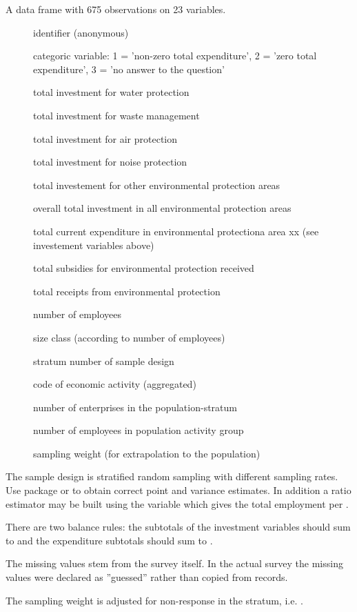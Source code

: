 \begin{Format}
A data frame with 675 observations on 23 variables.
\begin{description}

\item[] identifier (anonymous)
\item[] categoric variable: 1 = 'non-zero total expenditure', 2  = 'zero total expenditure', 3 = 'no answer to the question'
\item[] total investment for water protection
\item[] total investment for waste management
\item[] total investment for air protection
\item[] total investment for noise protection
\item[] total investement for other environmental protection areas
\item[] overall total investment in all environmental protection areas
\item[] total current expenditure in environmental protectiona area xx (see investement variables above)
\item[] total subsidies for environmental protection received
\item[] total receipts from environmental protection
\item[] number of employees
\item[] size class (according to number of employees)
\item[] stratum number of sample design
\item[] code of economic activity (aggregated)
\item[] number of enterprises in the population-stratum	
\item[] number of employees in population activity group
\item[] sampling weight (for extrapolation to the population)

\end{description}

\end{Format}
%
\begin{Details}\relax
The sample design is stratified random sampling with different sampling rates. Use package  or  to obtain correct point and variance estimates. In addition a ratio estimator may be built using the variable  which gives the total employment per . 

There are two balance rules: the subtotals of the investment variables should sum to  and the expenditure subtotals  should sum to . 

The missing values stem from the survey itself. In the actual survey the missing values were declared as ''guessed'' rather than copied from records. 

The sampling weight  is adjusted for non-response in the stratum, i.e. . 
\end{Details}
